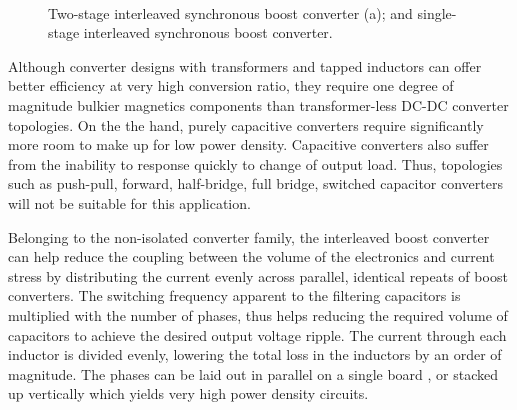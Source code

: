     \begin{figure}
        \centering
        \\
        \caption{Two-stage interleaved synchronous boost converter (a); and single-stage interleaved synchronous boost converter.}
    \end{figure}
    
    Although converter designs with transformers and tapped inductors can offer better efficiency at very high conversion ratio, they require one degree of magnitude bulkier magnetics components than transformer-less DC-DC converter topologies. On the the hand, purely capacitive converters require significantly more room to make up for low power density. Capacitive converters also suffer from the inability to response quickly to change of output load. Thus, topologies such as push-pull, forward, half-bridge, full bridge, switched capacitor converters will not be suitable for this application. 
    
    
    Belonging to the non-isolated converter family, the interleaved boost converter can help reduce the coupling between the volume of the electronics and current stress by distributing the current evenly across parallel, identical repeats of boost converters. The switching frequency apparent to the filtering capacitors is multiplied with the number of phases, thus helps reducing the required volume of capacitors to achieve the desired output voltage ripple. The current through each inductor is divided evenly, lowering the total loss in the inductors by an order of magnitude. The phases can be laid out in parallel on a single board \cite{Pang2016}, or stacked up vertically \cite{Huang2016} which yields very high power density circuits. 

